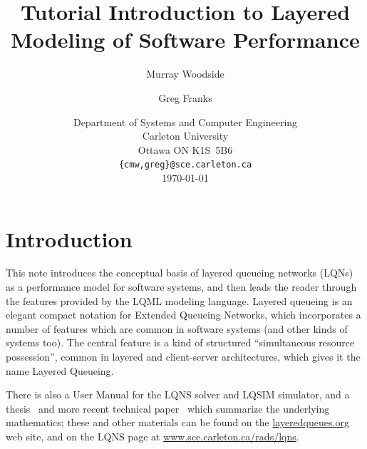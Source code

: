 \documentclass[11pt]{article}
\begin{document}
\title{Tutorial Introduction to Layered Modeling of Software Performance}

\author{Murray Woodside \and Greg Franks}
\date{Department of Systems and Computer Engineering\\
  Carleton University\\
  Ottawa ON K1S~5B6\\
  \texttt{\{cmw,greg\}@sce.carleton.ca}\\[1cm]
  \today}
\maketitle
\clearpage
\tableofcontents
\clearpage

\section{Introduction}

This note introduces the conceptual basis of layered queueing networks (LQNs) as a
performance model for software systems, and then leads the reader through the features provided by
the LQML modeling language. Layered queueing is an elegant compact notation for Extended
Queueing Networks, which incorporates a number of features which are common in software
systems (and other kinds of systems too). The central feature is a kind of structured ``simultaneous
resource possession'', common in layered and client-server architectures, which gives it the name
Layered Queueing.

There is also a User Manual for the LQNS solver and LQSIM simulator, and a thesis~\cite{THESIS:franks-99} and
more recent technical paper~\cite{IEEESE:franks-2009-ieeese-lqn} which summarize the underlying mathematics; these and other
materials can be found on the \href{http://layeredqueues.org}{layeredqueues.org} web site, and on the LQNS page at
\url{www.sce.carleton.ca/rads/lqns}.
\end{document}

